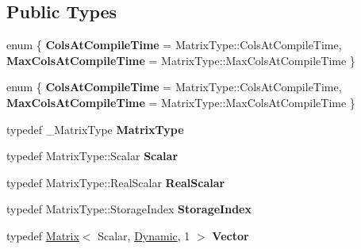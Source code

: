 \subsection*{Public Types}
\begin{DoxyCompactItemize}
\item 
\mbox{\label{class_eigen_1_1_umf_pack_l_u_a9fe7d94374b29ecedc056d53eebd450a}} 
enum \{ {\bfseries Cols\+At\+Compile\+Time} = Matrix\+Type\+:\+:Cols\+At\+Compile\+Time, 
{\bfseries Max\+Cols\+At\+Compile\+Time} = Matrix\+Type\+:\+:Max\+Cols\+At\+Compile\+Time
 \}
\item 
\mbox{\label{class_eigen_1_1_umf_pack_l_u_affeea2a09e9464f1c64fc1895f54f40d}} 
enum \{ {\bfseries Cols\+At\+Compile\+Time} = Matrix\+Type\+:\+:Cols\+At\+Compile\+Time, 
{\bfseries Max\+Cols\+At\+Compile\+Time} = Matrix\+Type\+:\+:Max\+Cols\+At\+Compile\+Time
 \}
\item 
\mbox{\label{class_eigen_1_1_umf_pack_l_u_aa85376b53299c17d415b99a48ad64f76}} 
typedef \+\_\+\+Matrix\+Type {\bfseries Matrix\+Type}
\item 
\mbox{\label{class_eigen_1_1_umf_pack_l_u_a625a5b4478cb698e878db8ca83785371}} 
typedef Matrix\+Type\+::\+Scalar {\bfseries Scalar}
\item 
\mbox{\label{class_eigen_1_1_umf_pack_l_u_a578eb1ae6d86e048cf4ca1d3ef5b2267}} 
typedef Matrix\+Type\+::\+Real\+Scalar {\bfseries Real\+Scalar}
\item 
\mbox{\label{class_eigen_1_1_umf_pack_l_u_a8514e6012b9f99251e088cb4a5188408}} 
typedef Matrix\+Type\+::\+Storage\+Index {\bfseries Storage\+Index}
\item 
\mbox{\label{class_eigen_1_1_umf_pack_l_u_a8be64e184384e92d68b90ed69ae8e20c}} 
typedef \hyperlink{group___core___module_class_eigen_1_1_matrix}{Matrix}$<$ Scalar, \hyperlink{namespace_eigen_ad81fa7195215a0ce30017dfac309f0b2}{Dynamic}, 1 $>$ {\bfseries Vector}
\item 
\mbox{\label{class_eigen_1_1_umf_pack_l_u_a90d91ae46799346e6352a78e3500adcf}} 

\end{DoxyCompactItemize}
